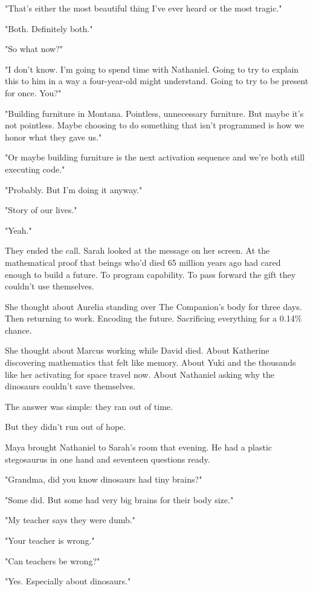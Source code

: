 "That's either the most beautiful thing I've ever heard or the most tragic."

"Both. Definitely both."

"So what now?"

"I don't know. I'm going to spend time with Nathaniel. Going to try to explain this to him in a way a four-year-old might understand. Going to try to be present for once. You?"

"Building furniture in Montana. Pointless, unnecessary furniture. But maybe it's not pointless. Maybe choosing to do something that isn't programmed is how we honor what they gave us."

"Or maybe building furniture is the next activation sequence and we're both still executing code."

"Probably. But I'm doing it anyway."

"Story of our lives."

"Yeah."

They ended the call. Sarah looked at the message on her screen. At the mathematical proof that beings who'd died 65 million years ago had cared enough to build a future. To program capability. To pass forward the gift they couldn't use themselves.

She thought about Aurelia standing over The Companion's body for three days. Then returning to work. Encoding the future. Sacrificing everything for a 0.14\% chance.

She thought about Marcus working while David died. About Katherine discovering mathematics that felt like memory. About Yuki and the thousands like her activating for space travel now. About Nathaniel asking why the dinosaurs couldn't save themselves.

The answer was simple: they ran out of time.

But they didn't run out of hope.

\scenebreak

Maya brought Nathaniel to Sarah's room that evening. He had a plastic stegosaurus in one hand and seventeen questions ready.

"Grandma, did you know dinosaurs had tiny brains?"

"Some did. But some had very big brains for their body size."

"My teacher says they were dumb."

"Your teacher is wrong."

"Can teachers be wrong?"

"Yes. Especially about dinosaurs."

